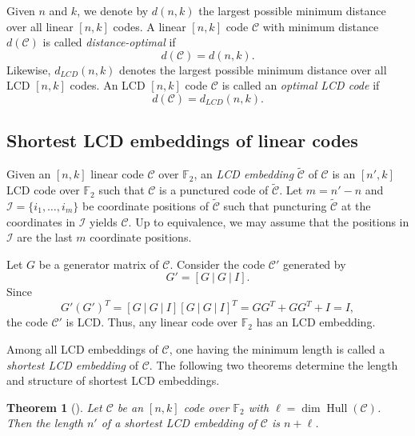 \documentclass{article}
\newtheorem{theorem}{Theorem}[section]
\theoremstyle{definition}
\theoremstyle{remark}
\begin{document}
Given $n$ and $k$, we denote by $d(n, k)$ the largest possible minimum distance over all linear $[n, k]$ codes. A linear $[n,k]$ code $\mathcal{C}$ with minimum distance $d(\mathcal{C})$ is called \textit{distance-optimal} if
\[
d(\mathcal{C})=d(n,k).
\]
Likewise, $d_{LCD}(n,k)$ denotes the largest possible minimum distance over all LCD $[n,k]$ codes. An LCD $[n,k]$ code $\mathcal{C}$ is called an \textit{optimal LCD code} if
\[
d(\mathcal{C})=d_{LCD}(n,k).
\]

\subsection{Shortest LCD embeddings of linear codes}
Given an $[n,k]$ linear code $\mathcal{C}$ over $\mathbb{F}_2$, an \textit{LCD embedding} $\tilde{\mathcal{C}}$ of $\mathcal{C}$ is an $[n',k]$ LCD code over $\mathbb{F}_2$ such that $\mathcal{C}$ is a punctured code of $\tilde{\mathcal{C}}$. Let $m=n'-n$ and $\mathcal{I}=\{i_1, \ldots , i_m\}$ be coordinate positions of $\tilde{\mathcal{C}}$ such that puncturing $\tilde{\mathcal{C}}$ at the coordinates in $\mathcal{I}$ yields $\mathcal{C}$. Up to equivalence, we may assume that the positions in $\mathcal{I}$ are the last $m$ coordinate positions.

Let $G$ be a generator matrix of $\mathcal{C}$. Consider the code $\mathcal{C}'$ generated by
\[
G'=[G~|~G~|~I].
\]
Since
\[
G'(G')^T=[G~|~G~|~I][G~|~G~|~I]^T=GG^T+GG^T+I=I,
\]
the code $\mathcal{C}'$ is LCD. Thus, any linear code over $\mathbb{F}_2$ has an LCD embedding.

Among all LCD embeddings of $\mathcal{C}$, one having the minimum length is called a \textit{shortest LCD embedding} of $\mathcal{C}$. The following two theorems determine the length and structure of shortest LCD embeddings.

\begin{theorem}[\cite{AHKL-2026}]
    Let $\mathcal{C}$ be an $[n,k]$ code over $\mathbb{F}_2$ with $\ell=\dim\operatorname{Hull}(\mathcal{C})$. Then the length $n'$ of a shortest LCD embedding of $\mathcal{C}$ is $n+\ell$.
\end{theorem}
\end{document}

